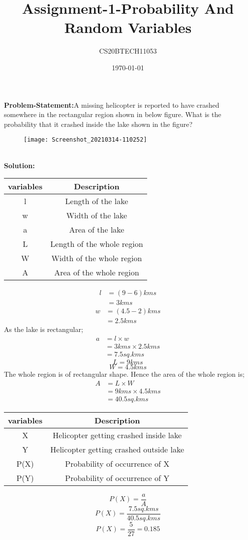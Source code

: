 \documentclass[11pt,a4paper,twocolumn]{article}
\title{Assignment-1-Probability And Random Variables}
\author{CS20BTECH11053 }
\date{\today}
\begin{document}
\maketitle

\textbf{Problem-Statement:}A missing helicopter is reported to have crashed somewhere in the rectangular region shown in below figure. What is the probability that it crashed inside the lake shown in the figure?
\begin{figure}[h]
\centering
 \texttt{[image: Screenshot\_20210314-110252]}
\end{figure}
\\\textbf{Solution:}
\begin{table}[h!]
    \centering
    \begin{tabular}{|c|c|}
    \hline
        variables & Description\\
        \hline
        l&Length of the lake\\
        \hline
        w&Width of the lake\\
        \hline
        a&Area of the lake\\
        \hline
        L&Length of the whole region\\
        \hline
        W&Width of the whole region\\
        \hline
        A&Area of the whole region\\
        \hline
        \end{tabular}
        \label{tab:my_label}
\end{table}
\begin{align*}
l &= (9-6)kms\\
  &= 3kms 
\end{align*}
\begin{align*}
w&=(4.5-2)kms\\
 &=2.5kms
\end{align*}
As the lake is rectangular;
\begin{align*}
a &={l}\times{w}\\
&={3kms}\times{2.5kms}\\
&=7.5sq.kms
\end{align*}
$$L=9kms$$
$$W=4.5kms$$
The whole region is of rectangular shape. Hence the area of the whole region is;
\begin{align*}
A &={L}\times{W}\\
&={9kms}\times{4.5kms}\\
&=40.5sq.kms
\end{align*}
\begin{table}[h!]
    \centering
    \begin{tabular}{|c|c|}
    \hline
        variables & Description\\
        \hline
        X&Helicopter getting crashed inside lake\\
        \hline
        Y&Helicopter getting crashed outside lake\\
        \hline
        P(X)&Probability of occurrence of X\\
        \hline
        P(Y)&Probability of occurrence of Y\\
        \hline
        \end{tabular}
        \label{tab:my_label}
\end{table}
$$P(X)=\frac{a}{A}$$
$$P(X)=\frac{7.5sq.kms}{40.5sq.kms}$$
$$P(X)=\frac{5}{27}=0.185$$
\end{document}
